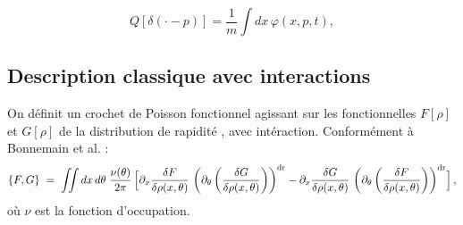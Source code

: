 \begin{equation}
Q[\delta(\cdot - p)] = \frac{1}{m} \int dx \, \varphi(x, p, t),
\end{equation}

%
%
%
%

\subsection{Description classique avec interactions}

On définit un crochet de Poisson fonctionnel agissant sur les fonctionnelles $F[\rho]$ et $G[\rho]$  de la distribution de rapidité , avec intéraction. Conformément à Bonnemain et al.\cite{bonnemain2024hamiltonian}  :
\begin{equation}
	\{F,G\}\;=\;\iint dx\,d\theta\;\frac{\nu(\theta)}{2\pi}\,\Bigl[\partial_x\frac{\delta F}{\delta \rho(x,\theta)}\,\left(\partial_\theta \left ( \frac{\delta G}{\delta \rho(x,\theta)} \right ) \right)^{\mathrm{dr}} -\partial_x\frac{\delta G}{\delta \rho (x,\theta)}\,\left( \partial_\theta \left ( \frac{\delta F}{\delta \rho (x,\theta)} \right )\right)^{\mathrm{dr}} \Bigr]\,,	
\end{equation}
où $\nu$ est la fonction d’occupation.

